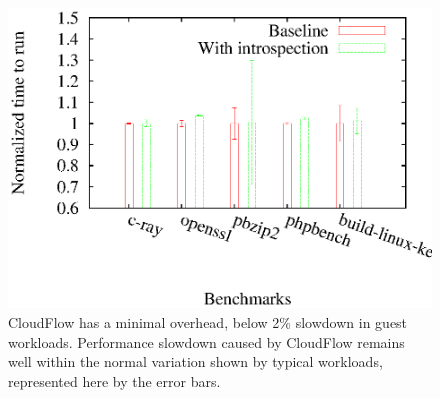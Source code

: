 \begin{figure}[t]
\begin{center}
\includegraphics[scale=0.6]{figures/guestslowdown.eps}
\caption{\small 
%
CloudFlow has a minimal overhead, below 2\% slowdown in guest workloads. 
Performance slowdown caused by CloudFlow remains well within the normal
variation shown by typical workloads, represented here by the error bars. 
%
\label{cloudflow:figure:guestslowdown}}
\end{center}
\end{figure}



